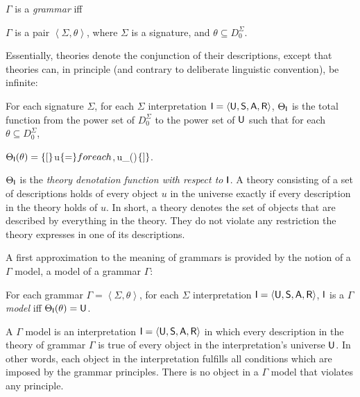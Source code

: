 \documentclass[output=paper
                ,modfonts
                ,nonflat
	        ,collection
	        ,collectionchapter
	        ,collectiontoclongg
 	        ,biblatex
                ,babelshorthands
                ,newtxmath
                ,draftmode
                ,colorlinks, citecolor=brown
]{./langsci/langscibook}
\begin{document}
{{\begin{mydef}\label{def-grammar}
  $\Gamma$ is a \emph{grammar} iff
  
$\Gamma$ is a pair
\( \left<\Sigma, \theta \right>\), where
$\Sigma$ is a signature, and
$\theta \subseteq D_0^{\Sigma}$.
\end{mydef}

Essentially, theories denote the conjunction of their descriptions,
except that theories can, in principle (and contrary to deliberate linguistic
convention), be infinite:

\begin{mydef}
For each signature $\Sigma$,
for each $\Sigma$ interpretation $\mathsf{I}=\langle\mathsf{U},\mathsf{S},\mathsf{A},\mathsf{R}\rangle$,
$\Theta_{\mathsf{I}}$ is the total function from the power set of $D_0^{\Sigma}$ to the
power set of $\mathsf{U}$ such that
for each $\theta\subseteq D_0^{\Sigma}$,

$\Theta_{\Inte}(\theta)= %
\set[
$u\in \Unive$
\{{=}\} for each $\delta \in \theta$,
      $u\in\Dinte_{\Inte}(\delta)$
\{{]}\}$.
\end{mydef}

$\Theta_{\mathsf{I}}$ is the \emph{theory denotation function with respect
  to $\mathsf{I}$}. A theory consisting of a set of descriptions holds of
every object $u$ in the universe exactly if every description in the theory
holds of $u$. In short, a theory denotes the set of objects that are described
by everything in the theory. They do not violate any restriction the theory
expresses in one of its descriptions.


A first approximation to the meaning of grammars is provided by the notion
of a $\Gamma$ model, a model of a grammar $\Gamma$:

\begin{mydef}\label{def-rsrl-model}
For each grammar $\Gamma = \left< \Sigma, \theta \right>$,
for each $\Sigma$ interpretation $\mathsf{I}=\langle\mathsf{U},\mathsf{S},\mathsf{A},\mathsf{R}\rangle$,
$\mathsf{I}$
is a \emph{$\Gamma$ model} iff
\(\Theta_{\mathsf{I}}(\theta) =\mathsf{U}\).
\end{mydef}

A $\Gamma$ model is an interpretation $\mathsf{I}=\langle\mathsf{U},\mathsf{S},\mathsf{A},\mathsf{R}\rangle$ in which
every description in the theory of grammar $\Gamma$ is true of every object
in the interpretation's universe $\mathsf{U}$. In other words, each object
in the interpretation fulfills all conditions which are imposed by
the grammar principles. There is no object in a $\Gamma$ model that
violates any principle.

}}
\end{document}
